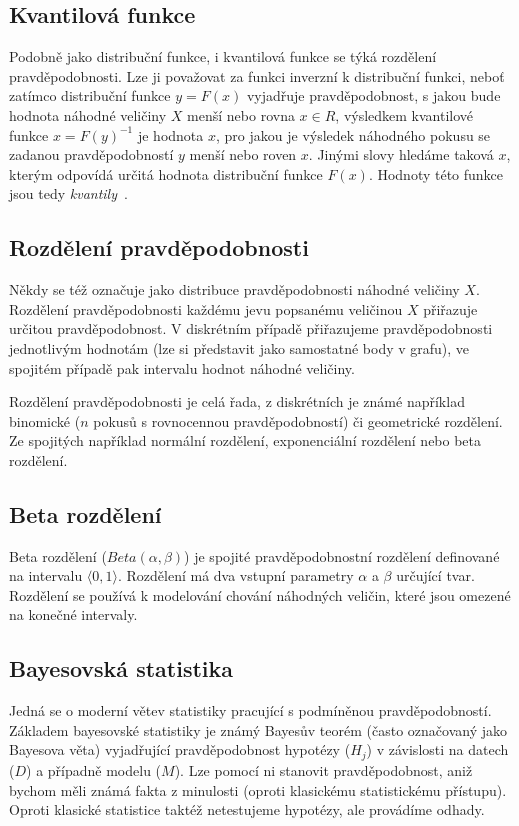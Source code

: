 \documentclass[thesis=M,czech]{FITthesis}[2014/05/07]
\begin{document}
\subsection{Kvantilová funkce}
Podobně jako distribuční funkce, i kvantilová funkce se týká rozdělení pravděpodobnosti. Lze ji považovat za funkci inverzní k distribuční funkci, neboť zatímco distribuční funkce $y = F(x)$ vyjadřuje pravděpodobnost, s jakou bude hodnota náhodné veličiny $X$ menší nebo rovna $x \in R$, výsledkem kvantilové funkce $x = F(y)^{-1}$ je hodnota $x$, pro jakou je výsledek náhodného pokusu se zadanou pravděpodobností $y$ menší nebo roven $x$. Jinými slovy hledáme taková $x$, kterým odpovídá určitá hodnota distribuční funkce $F(x)$. Hodnoty této funkce jsou tedy \emph{kvantily}~\cite{pst2}.

\subsection{Rozdělení pravděpodobnosti}
Někdy se též označuje jako distribuce pravděpodobnosti náhodné veličiny $X$. 
Rozdělení pravděpodobnosti každému jevu popsanému veličinou $X$ přiřazuje určitou pravděpodobnost. V diskrétním případě přiřazujeme pravděpodobnosti jednotlivým hodnotám (lze si představit jako samostatné body v grafu), ve spojitém případě pak intervalu hodnot náhodné veličiny. 

Rozdělení pravděpodobnosti je celá řada, z diskrétních je známé například binomické ($n$ pokusů s rovnocennou pravděpodobností) či geometrické rozdělení. Ze spojitých například normální rozdělení, exponenciální rozdělení nebo beta rozdělení.

\subsection{Beta rozdělení}
Beta rozdělení (${Beta}(\alpha, \beta)$) je spojité pravděpodobnostní rozdělení definované na intervalu $\langle0,1\rangle$. Rozdělení má dva vstupní parametry $\alpha$ a $\beta$ určující tvar. Rozdělení se používá k modelování chování náhodných veličin, které jsou omezené na konečné intervaly. 

\subsection{Bayesovská statistika}
Jedná se o moderní větev statistiky pracující s podmíněnou pravděpodobností. Základem bayesovské statistiky je známý Bayesův teorém (často označovaný jako Bayesova věta) vyjadřující pravděpodobnost hypotézy ($H_j$) v závislosti na datech ($D$) a případně modelu ($M$). Lze pomocí ni stanovit pravděpodobnost, aniž bychom měli známá fakta z minulosti (oproti klasickému statistickému přístupu). Oproti klasické statistice taktéž netestujeme hypotézy, ale provádíme odhady. 
\end{document}
